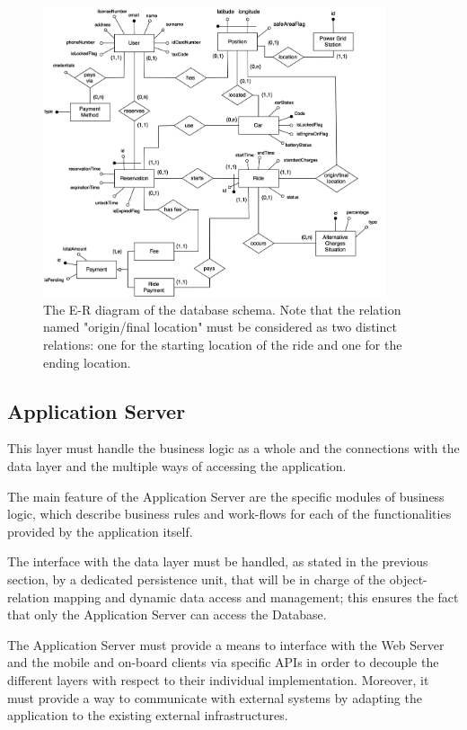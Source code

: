 \begin{figure}[H]
\begin{center}
		\includegraphics[width=0.9\textwidth]{./arch_design/diagrams/er_dg.png}
		\caption{The E-R diagram of the database schema. Note that the relation named "origin/final location" must be considered as two distinct relations: one for the starting location of the ride and one for the ending location.}
		\label{er_dg}
\end{center}
\end{figure}

\subsection{Application Server}
This layer must handle the business logic as a whole and the connections with the data layer and the multiple ways of accessing the application.

The main feature of the Application Server are the specific modules of business logic, which describe business rules and work-flows for each of the functionalities provided by the application itself.

The interface with the data layer must be handled, as stated in the previous section, by a dedicated persistence unit, that will be in charge of the object-relation mapping and dynamic data access and management; this ensures the fact that only the Application Server can access the Database.

The Application Server must provide a means to interface with the Web Server and the mobile and on-board clients via specific APIs in order to decouple the different layers with respect to their individual implementation. Moreover, it must provide a way to communicate with external systems by adapting the application to the existing external infrastructures.

